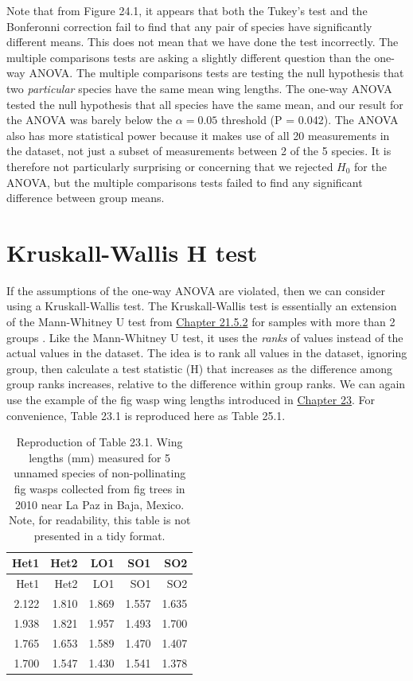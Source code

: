 \documentclass[
]{scrbook}
\begin{document}
Note that from Figure 24.1, it appears that both the Tukey's test and the Bonferonni correction fail to find that any pair of species have significantly different means.
This does not mean that we have done the test incorrectly.
The multiple comparisons tests are asking a slightly different question than the one-way ANOVA.
The multiple comparisons tests are testing the null hypothesis that two \emph{particular} species have the same mean wing lengths.
The one-way ANOVA tested the null hypothesis that all species have the same mean, and our result for the ANOVA was barely below the \(\alpha = 0.05\) threshold (P = 0.042).
The ANOVA also has more statistical power because it makes use of all 20 measurements in the dataset, not just a subset of measurements between 2 of the 5 species.
It is therefore not particularly surprising or concerning that we rejected \(H_{0}\) for the ANOVA, but the multiple comparisons tests failed to find any significant difference between group means.

\hypertarget{Chapter_25}{%
\chapter{Kruskall-Wallis H test}\label{Chapter_25}}

If the assumptions of the one-way ANOVA are violated, then we can consider using a Kruskall-Wallis test.
The Kruskall-Wallis test is essentially an extension of the Mann-Whitney U test from \protect\hyperlink{mann-whitney-u-test}{Chapter 21.5.2} for samples with more than 2 groups \citep{Kruskal1952}.
Like the Mann-Whitney U test, it uses the \emph{ranks} of values instead of the actual values in the dataset.
The idea is to rank all values in the dataset, ignoring group, then calculate a test statistic (H) that increases as the difference among group ranks increases, relative to the difference within group ranks.
We can again use the example of the fig wasp wing lengths introduced in \protect\hyperlink{Chapter_23}{Chapter 23}.
For convenience, Table 23.1 is reproduced here as Table 25.1.

\begin{longtable}[]{@{}rrrrr@{}}
\caption{\label{tab:unnamed-chunk-116}Reproduction of Table 23.1. Wing lengths (mm) measured for 5 unnamed species of non-pollinating fig wasps collected from fig trees in 2010 near La Paz in Baja, Mexico. Note, for readability, this table is not presented in a tidy format.}\tabularnewline
\toprule
Het1 & Het2 & LO1 & SO1 & SO2 \\
\midrule
\endfirsthead
\toprule
Het1 & Het2 & LO1 & SO1 & SO2 \\
\midrule
\endhead
2.122 & 1.810 & 1.869 & 1.557 & 1.635 \\
1.938 & 1.821 & 1.957 & 1.493 & 1.700 \\
1.765 & 1.653 & 1.589 & 1.470 & 1.407 \\
1.700 & 1.547 & 1.430 & 1.541 & 1.378 \\
\bottomrule
\end{longtable}
\end{document}
